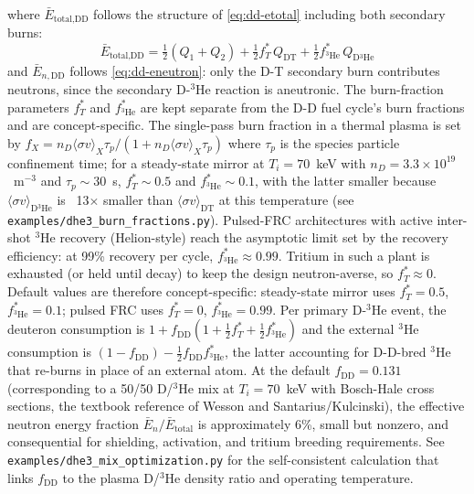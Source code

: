 \documentclass{article}
\begin{document}
\noindent where $\bar{E}_{\text{total,DD}}$ follows the structure
of \cref{eq:dd-etotal} including both secondary burns:
\begin{equation*}
\bar{E}_{\text{total,DD}} = \tfrac{1}{2}(Q_1 + Q_2)
  + \tfrac{1}{2} f_T^* \, Q_{\text{DT}}
  + \tfrac{1}{2} f_{{}^3\text{He}}^*
    \, Q_{\text{D}{}^3\text{He}}
\end{equation*}
and $\bar{E}_{n,\text{DD}}$ follows \cref{eq:dd-eneutron}: only the
D-T secondary burn contributes neutrons, since the secondary
D-${}^3$He reaction is aneutronic. The burn-fraction parameters
$f_T^*$ and $f_{{}^3\text{He}}^*$
are kept separate from the D-D fuel cycle's burn fractions and are
concept-specific. The single-pass burn fraction in a thermal plasma
is set by $f_X = n_D \langle\sigma v\rangle_X \tau_p / (1 + n_D
\langle\sigma v\rangle_X \tau_p)$ where $\tau_p$ is the species
particle confinement time; for a steady-state mirror at $T_i = 70$~keV
with $n_D = 3.3 \times 10^{19}$~m${}^{-3}$ and $\tau_p \sim 30$~s,
$f_T^* \sim 0.5$ and $f_{{}^3\text{He}}^* \sim 0.1$, with the latter
smaller because $\langle\sigma v\rangle_{\text{D}{}^3\text{He}}$ is
~13$\times$ smaller than $\langle\sigma v\rangle_{\text{DT}}$ at this
temperature (see
\texttt{examples/dhe3\_burn\_fractions.py}). Pulsed-FRC architectures
with active inter-shot ${}^3$He recovery (Helion-style) reach the
asymptotic limit set by the recovery efficiency: at 99\% recovery
per cycle, $f_{{}^3\text{He}}^* \approx 0.99$. Tritium in such a
plant is exhausted (or held until decay) to keep the design
neutron-averse, so $f_T^* \approx 0$. Default values are therefore
concept-specific: steady-state mirror uses $f_T^* = 0.5$,
$f_{{}^3\text{He}}^* = 0.1$; pulsed FRC uses $f_T^* = 0$,
$f_{{}^3\text{He}}^* = 0.99$.
Per primary D-${}^3$He event, the deuteron
consumption is $1 + f_{\text{DD}} (1 + \tfrac{1}{2} f_T^*
+ \tfrac{1}{2} f_{{}^3\text{He}}^*)$ and the
external ${}^3$He consumption is $(1 - f_{\text{DD}})
- \tfrac{1}{2} f_{\text{DD}} f_{{}^3\text{He}}^*$,
the latter accounting for D-D-bred ${}^3$He that re-burns in place
of an external atom.
At the default $f_{\text{DD}} = 0.131$ (corresponding to a
50/50 D/${}^3$He mix at $T_i = 70$~keV with Bosch-Hale cross sections,
the textbook reference of Wesson and Santarius/Kulcinski), the
effective neutron energy fraction
$\bar{E}_n / \bar{E}_{\text{total}}$ is approximately 6\%, small but
nonzero, and consequential for shielding, activation, and tritium
breeding requirements. See \texttt{examples/dhe3\_mix\_optimization.py}
for the self-consistent calculation that links $f_{\text{DD}}$ to the
plasma D/${}^3$He density ratio and operating temperature.
\end{document}
